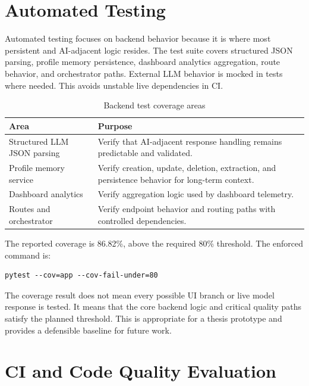 \section{Automated Testing}

Automated testing focuses on backend behavior because it is where most persistent and AI-adjacent logic resides. The test suite covers structured JSON parsing, profile memory persistence, dashboard analytics aggregation, route behavior, and orchestrator paths. External LLM behavior is mocked in tests where needed. This avoids unstable live dependencies in CI.

\begin{table}[H]
\centering
\caption{Backend test coverage areas}
\label{tab:test-areas}
\begin{tabular}{|p{}|p{}|}
\hline
\textbf{Area} & \textbf{Purpose}\\
\hline
Structured LLM JSON parsing & Verify that AI-adjacent response handling remains predictable and validated.\\
\hline
Profile memory service & Verify creation, update, deletion, extraction, and persistence behavior for long-term context.\\
\hline
Dashboard analytics & Verify aggregation logic used by dashboard telemetry.\\
\hline
Routes and orchestrator & Verify endpoint behavior and routing paths with controlled dependencies.\\
\hline
\end{tabular}
\end{table}

The reported coverage is 86.82\%, above the required 80\% threshold. The enforced command is:

\begin{lstlisting}[caption={Coverage command used for evaluation},label={lst:coverage-command}]
pytest --cov=app --cov-fail-under=80
\end{lstlisting}

The coverage result does not mean every possible UI branch or live model response is tested. It means that the core backend logic and critical quality paths satisfy the planned threshold. This is appropriate for a thesis prototype and provides a defensible baseline for future work.

\section{CI and Code Quality Evaluation}

